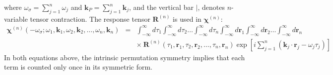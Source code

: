 \documentclass{article}[12pt]
\theoremstyle{plain}
\begin{document}
where $\omega_{\sigma}=\sum_{j=1}^n \omega_j$ and $\mathbf{k}_P = \sum_{j=1}^n \mathbf{k}_j$, and
the vertical bar $|$, denotes $n$-variable tensor contraction.
The response tensor $\mathbf{R}^{(n)}$ is used in $\mathbf{\chi}^{(n)}$:
\begin{eqnarray}
\mathbf{\chi}^{(n)}(-\omega_{\sigma};\omega_1,\mathbf{k}_1,\omega_2,\mathbf{k}_2,\ldots,\omega_n,\mathbf{k}_n) & = &
\int_{-\infty}^\infty d\tau_1 \int_{-\infty}^\infty d\tau_2 \ldots \int_{-\infty}^\infty d\tau_n
\int_{-\infty}^\infty d\mathbf{r}_1 \int_{-\infty}^\infty d\mathbf{r}_2 \ldots \int_{-\infty}^\infty d\mathbf{r}_n \nonumber \\
& & \times\ \mathbf{R}^{(n)}(\tau_1,\mathbf{r}_1,\tau_2,\mathbf{r}_2,\dots,\tau_n,\mathbf{r}_n)
\exp[i \sum_{j=1}^n(\mathbf{k}_j\cdot\mathbf{r}_j-\omega_j\tau_j)] \nonumber
\end{eqnarray}
In both equations above, the intrinsic permutation symmetry implies that each term is counted
only once in its symmetric form. 
\end{document}
